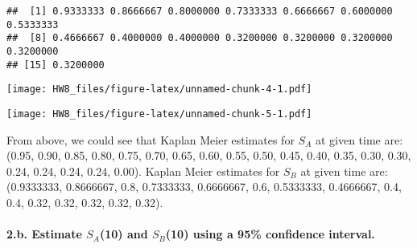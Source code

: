 \documentclass[]{article}
\newenvironment{Shaded}{\begin{snugshade}}{\end{snugshade}}
\newcommand{\DataTypeTok}[1]{\textcolor[rgb]{0.13,0.29,0.53}{#1}}
\newcommand{\KeywordTok}[1]{\textcolor[rgb]{0.13,0.29,0.53}{\textbf{#1}}}
\newcommand{\NormalTok}[1]{#1}
\newcommand{\OperatorTok}[1]{\textcolor[rgb]{0.81,0.36,0.00}{\textbf{#1}}}
\newcommand{\StringTok}[1]{\textcolor[rgb]{0.31,0.60,0.02}{#1}}
\let\oldparagraph\paragraph
\renewcommand{\paragraph}[1]{\oldparagraph{#1}\mbox{}}
\begin{document}
\begin{verbatim}
##  [1] 0.9333333 0.8666667 0.8000000 0.7333333 0.6666667 0.6000000 0.5333333
##  [8] 0.4666667 0.4000000 0.4000000 0.3200000 0.3200000 0.3200000 0.3200000
## [15] 0.3200000
\end{verbatim}

\begin{Shaded}
\end{Shaded}

\texttt{[image: HW8\_files/figure-latex/unnamed-chunk-4-1.pdf]}

\begin{Shaded}
\end{Shaded}

\texttt{[image: HW8\_files/figure-latex/unnamed-chunk-5-1.pdf]}

From above, we could see that Kaplan Meier estimates for \(S_A\) at
given time are: (0.95, 0.90, 0.85, 0.80, 0.75, 0.70, 0.65, 0.60, 0.55,
0.50, 0.45, 0.40, 0.35, 0.30, 0.30, 0.24, 0.24, 0.24, 0.24, 0.00).
Kaplan Meier estimates for \(S_B\) at given time are: (0.9333333,
0.8666667, 0.8, 0.7333333, 0.6666667, 0.6, 0.5333333, 0.4666667, 0.4,
0.4, 0.32, 0.32, 0.32, 0.32, 0.32).

\hypertarget{b.-estimate-s_a10-and-s_b10-using-a-95-confidence-interval.}{%
\paragraph{\texorpdfstring{2.b. Estimate \(S_A\)(10) and \(S_B\)(10)
using a 95\% confidence
interval.}{2.b. Estimate S\_A(10) and S\_B(10) using a 95\% confidence interval.}}\label{b.-estimate-s_a10-and-s_b10-using-a-95-confidence-interval.}}
\end{document}
